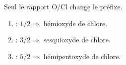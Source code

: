 \documentclass[11pt,a4paper]{article}
\begin{document}
\begin{corrige}
Seul le rapport O/Cl change le préfixe.
\begin{enumerate}[label=\alph*)]
  \item {} : $1/2 \Rightarrow$ hémioxyde de chlore.
  \item {} : $3/2 \Rightarrow$ sesquioxyde de chlore.
  \item {} : $5/2 \Rightarrow$ hémipentoxyde de chlore.
\end{enumerate}
\end{corrige}
\end{document}
